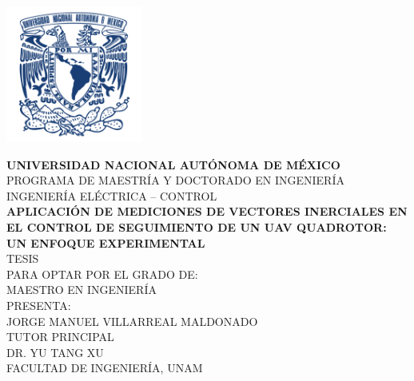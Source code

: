 \documentclass[11pt,letterpaper,twoside,openright]{report}
\begin{document}

\thispagestyle{empty}

\begin{titlepage}
	
	\begin{center}
		\includegraphics[height=4.5cm]{UNAM.png}	
	\end{center}
	
	\begin{center}
		\textbf{{\Large UNIVERSIDAD NACIONAL AUTÓNOMA DE MÉXICO}}\\
		PROGRAMA DE MAESTRÍA Y DOCTORADO EN INGENIERÍA\\
		INGENIERÍA ELÉCTRICA – CONTROL\\
		\vspace{2cm}
		\textbf{APLICACIÓN DE MEDICIONES DE VECTORES INERCIALES EN EL CONTROL DE SEGUIMIENTO DE UN UAV QUADROTOR: UN ENFOQUE EXPERIMENTAL}
		\\
		\vspace{2cm}
		TESIS\\
		PARA OPTAR POR EL GRADO DE:\\
		MAESTRO EN INGENIERÍA\\
		\vspace{2cm}
		PRESENTA:\\
		JORGE MANUEL VILLARREAL MALDONADO\\
		\vspace{1.8cm}
		TUTOR PRINCIPAL\\
		DR. YU TANG XU\\
		FACULTAD DE INGENIERÍA, UNAM\\
		

\end{center}
\end{titlepage}
\end{document}
